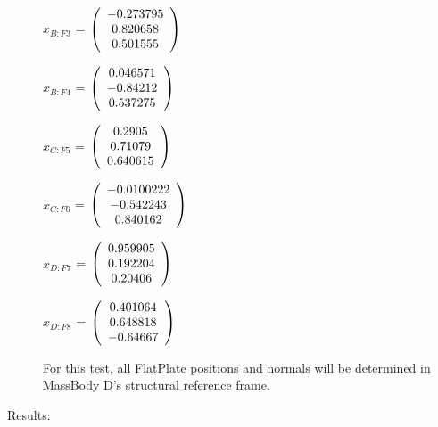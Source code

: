 \begin{description}
$\hat{x}_{B:F3}$ = $\left( \begin{array} {ccc}  -0.273795 \\   0.820658 \\   0.501555 
\end{array} \right)\\ \\$

$\hat{x}_{B:F4}$ = $\left( \begin{array} {ccc}   0.046571 \\   -0.84212 \\   0.537275 
\end{array} \right)\\ \\$

$\hat{x}_{C:F5}$ = $\left( \begin{array} {ccc}     0.2905 \\    0.71079 \\   0.640615 
\end{array} \right)\\ \\$

$\hat{x}_{C:F6}$ = $\left( \begin{array} {ccc} -0.0100222 \\  -0.542243 \\   0.840162 
\end{array} \right)\\ \\$

$\hat{x}_{D:F7}$ = $\left( \begin{array} {ccc}   0.959905 \\   0.192204 \\    0.20406 
\end{array} \right)\\ \\$

$\hat{x}_{D:F8}$ = $\left( \begin{array} {ccc}   0.401064 \\   0.648818 \\   -0.64667 
\end{array} \right)\\ \\$

For this test, all FlatPlate positions and normals will be determined in
MassBody D's structural reference frame.

\item[Results:] \ \newline


\end{description}
